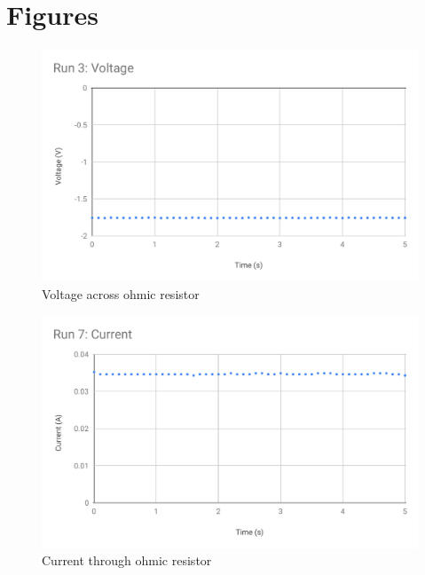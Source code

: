 \section{Figures}
\begin{figure}[ht]
	\centering
	\includegraphics[scale=0.74]{image/03-serial-parallel/resistor-V.pdf}
	\caption{Voltage across ohmic resistor}
	\label{figure.03.resistor.v}
\end{figure}
\begin{figure}[ht]
	\centering
	\includegraphics[scale=0.74]{image/03-serial-parallel/resistor-I.pdf}
	\caption{Current through ohmic resistor}
	\label{figure.03.resistor.i}
\end{figure}
